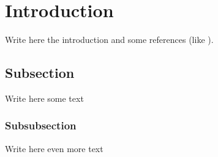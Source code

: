 \section{Introduction}

    Write here the introduction and some references (like \cite{api}
    ).

    \subsection{Subsection}

        Write here some text

        \subsubsection{Subsubsection}

            Write here even more text

\clearpage